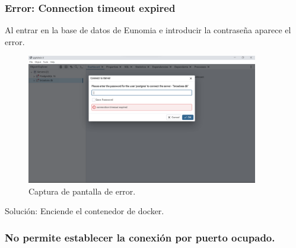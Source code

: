 \subsubsection{Error: Connection timeout expired}
Al entrar en la base de datos de Eunomia e introducir la contraseña aparece el error.

    \begin{figure}[H]
    \centering
    \includegraphics[width=0.90\textwidth]{figures/Error03ConnTime.png}
     \caption{Captura de pantalla de error.}
    \label{fig:Error03ConnTime}
    \end{figure}

Solución: Enciende el contenedor de docker.

\subsubsection{No permite establecer la conexión por puerto ocupado.}

 